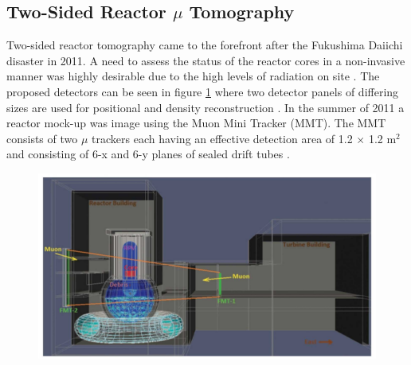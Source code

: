 \subsection{Two-Sided Reactor $\mu$ Tomography}
Two-sided reactor tomography came to the forefront after the Fukushima Daiichi disaster in 2011. A need to assess the status of the reactor cores in a non-invasive manner was highly desirable due to the high levels of radiation on site \cite{miyadera2013imaging}. The proposed detectors can be seen in figure \ref{fig:fukushimaImaging} where two detector panels of differing sizes are used for positional and density reconstruction \cite{miyadera2013imaging}. In the summer of 2011 a reactor mock-up was image using the Muon Mini Tracker (MMT). The MMT consists of two $\mu$ trackers each having an effective detection area of 1.2 $\times$ 1.2 m$^2$ and consisting of 6-x and 6-y planes of sealed drift tubes \cite{miyadera2013imaging}.

\begin{figure}[!h]
 \centering
 \includegraphics[width=0.7\linewidth]{Chapter5/Figs/MuTomographyExamples/fukushimaImaging.jpg}
 \label{fig:fukushimaImaging}
\end{figure}

